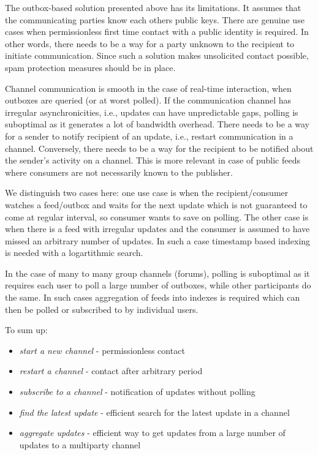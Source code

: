
The outbox-based solution presented above has its limitations. It assumes that the communicating parties know each others public keys. There are genuine use cases when permissionless first time contact with a public identity is required. In other words, there needs to be a way for a party unknown to the recipient to initiate communication. Since such a solution makes unsolicited contact possible, spam protection measures should be in place.

Channel communication is smooth in the case of real-time interaction, when outboxes are queried (or at worst polled). If the communication channel has irregular asynchronicities, i.e., updates can have unpredictable gaps, polling is suboptimal as it generates a lot of bandwidth overhead. There needs to be a way for a sender to notify recipient of an update, i.e., restart communication in a channel. Conversely, there needs to be a way for the recipient to be notified  about the  sender's activity on a channel. This is more relevant in case of public feeds where consumers are not necessarily known to the publisher. 

We distinguish two cases here: one use case is when the recipient/consumer watches a feed/outbox and waits for the next update which is not guaranteed to come at regular interval, so consumer wants to save on polling. The other case is when there is a feed with irregular updates and the consumer is assumed to have missed an arbitrary number of updates.
In such a case timestamp based indexing is needed with a logartithmic search.

In the case of many to many group channels (forums), polling is suboptimal as it requires each user to poll a large number of outboxes, while other participants do the same. In such cases aggregation of feeds into indexes is required which can then be polled or subscribed to by individual users.

To sum up:

\begin{itemize}
    \item \emph{start a new channel} - permissionless contact           
    \item \emph{restart a channel} - contact after arbitrary period
    \item \emph{subscribe to a channel} - notification of updates without polling
    \item \emph{find the latest update} - efficient search for the latest update in a channel
    \item \emph{aggregate updates} - efficient way to get updates from a large number of updates to a multiparty channel
\end{itemize} 

